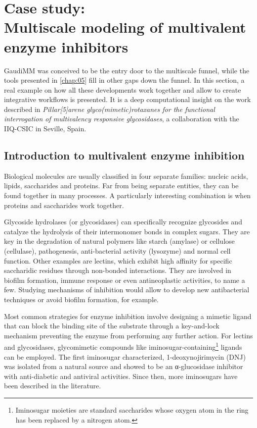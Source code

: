 
\section[Multiscale modeling of multivalent enzyme inhibitors]{Case study:\\
Multiscale modeling of multivalent enzyme inhibitors}
\label{section:rotaxane}
GaudiMM was conceived to be the entry door to the multiscale funnel, while the tools presented in \autoref{chap:05} fill in other gaps down the funnel. In this section, a real example on how all these developments work together and allow to create integrative workflows is presented. It is a deep computational insight on the work described in \textit{Pillar[5]arene glyco(mimetic)rotaxanes for the functional interrogation of multivalency responsive glycosidases},\cite{rotaxane} a collaboration with the IIQ-CSIC in Seville, Spain.

\subsection{Introduction to multivalent enzyme inhibition}
Biological molecules are usually classified in four separate families: nucleic acids, lipids, saccharides and proteins. Far from being separate entities, they can be found together in many processes. A particularly interesting combination is when proteins and saccharides work together.

Glycoside hydrolases (or glycosidases) can specifically recognize glycosides and catalyze the hydrolysis of their intermonomer bonds in complex sugars.  They are key in the degradation of natural polymers like starch (amylase) or cellulose (cellulase), pathogenesis, anti-bacterial activity (lysozyme) and normal cell function. Other examples are lectins, which exhibit high affinity for specific saccharidic residues through non-bonded interactions. They are involved in biofilm formation,\cite{tielker2005pseudomonas} immune response\cite{turner1996mannose} or even antineoplastic activities,\cite{adwan2014} to name a few. Studying mechanisms of inhibition would allow to develop new antibacterial techniques or avoid biofilm formation, for example.

Most common strategies for enzyme inhibition involve designing a mimetic ligand that can block the binding site of the substrate through a key-and-lock mechanism preventing the enzyme from performing any further action. For lectins and glycosidases, glycomimetic compounds like iminosugar-containing\footnote{Iminosugar moieties are standard saccharides whose oxygen atom in the ring has been replaced by a nitrogen atom.} ligands can be employed.  The first iminosugar characterized, 1-deoxynojirimycin (DNJ) was isolated from a natural source and showed to be an α-glucosidase inhibitor with anti-diabetic and antiviral activities. Since then, more iminosugars have been described in the literature.

